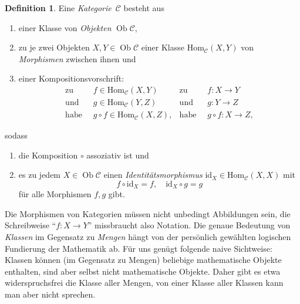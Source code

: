\documentclass[a4paper,ngerman]{scrartcl}
\theoremstyle{definition}
\newtheorem{defn}{Definition}[section]
\theoremstyle{plain}
\theoremstyle{remark}
\newcommand{\C}{\mathcal{C}}
\newcommand{\Hom}{\mathrm{Hom}}
\newcommand{\id}{\mathrm{id}}
\DeclareMathOperator{\Ob}{Ob}
\begin{document}
\begin{defn}
Eine \emph{Kategorie}~$\C$ besteht aus
\begin{enumerate}
  \item einer Klasse von \emph{Objekten} $\Ob \C$,
  \item zu je zwei Objekten $X,Y \in \Ob \C$ einer Klasse $\Hom_\C(X,Y)$ von
  \emph{Morphismen} zwischen ihnen und
  \item einer Kompositionsvorschrift:
  \begin{align*}
    \text{zu }\ & f \in \Hom_\C(X,Y) &
    \text{zu }\ & f : X \to Y \\
    \text{und }\ & g\in\Hom_\C(Y,Z) &
    \text{und }\ & g : Y \to Z \\
    \text{habe }\ & g\circ f\in\Hom_\C(X,Z), &
    \text{habe }\ & g\circ f : X \to Z,
  \end{align*}
\end{enumerate}
sodass
\begin{enumerate}
  \item die Komposition $\circ$ assoziativ ist und
  \item es zu jedem $X \in \Ob\C$ einen \emph{Identitätsmorphismus} $\id_X
  \in \Hom_\C(X,X)$ mit
  \[ f \circ \id_X = f, \quad \id_X \circ g = g \]
  für alle Morphismen $f,g$ gibt.
\end{enumerate}
\end{defn}

Die Morphismen von Kategorien müssen nicht unbedingt Abbildungen
sein, die Schreibweise "`$f:X \to Y$"' missbraucht also Notation. Die genaue
Bedeutung von \emph{Klassen} im Gegensatz zu \emph{Mengen} hängt von der
persönlich gewählten logischen Fundierung der Mathematik ab. Für uns genügt
folgende naive Sichtweise: Klassen können (im Gegensatz zu Mengen) beliebige
mathematische Objekte enthalten, sind aber selbst nicht mathematische Objekte.
Daher gibt es etwa widerspruchsfrei die Klasse aller Mengen, von einer Klasse
aller Klassen kann man aber nicht sprechen.
\end{document}
